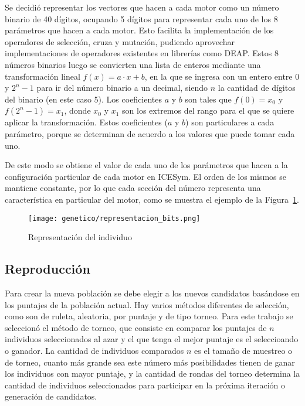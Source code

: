 Se decidió representar los vectores que hacen a cada motor como un número
binario de 40 dígitos, ocupando 5 dígitos para representar cada uno de los 8
parámetros que hacen a cada motor.
%
Esto facilita la implementación de los operadores de selección, cruza y
mutación, pudiendo aprovechar implementaciones de operadores existentes en
librerías como DEAP.
%
Estos 8 números binarios luego se convierten una lista de enteros mediante una
transformación lineal $f(x)=a\cdot x+b$, en la que se ingresa con un entero
entre 0 y $2^{n}-1$ para ir del número binario a un decimal, siendo $n$ la
cantidad de dígitos del binario (en este caso 5).
%
Los coeficientes $a$ y $b$ son tales que $f(0)=x_{0}$ y $f(2^{n}-1) = x_{1}$,
donde $x_{0}$ y $x_{1}$ son los extremos del rango para el que se quiere aplicar
la transformación.
%
Estos coeficientes ($a$ y $b$) son particulares a cada parámetro, porque se
determinan de acuerdo a los valores que puede tomar cada uno.

De este modo se obtiene el valor de cada uno de los parámetros que hacen a la
configuración particular de cada motor en ICESym.
%
El orden de los mismos se mantiene constante, por lo que cada sección del número
representa una característica en particular del motor, como se muestra el
ejemplo de la Figura~\ref{fig:pop_bit}.
%

\begin{figure}[ht]
  \centering
  \texttt{[image: genetico/representacion\_bits.png]}
  \caption{Representación del individuo}\label{fig:pop_bit}
\end{figure}


\subsection{Reproducción}

Para crear la nueva población se debe elegir a los nuevos candidatos basándose
en los puntajes de la población actual.
%
Hay varios métodos diferentes de selección, como son de ruleta, aleatoria, por
puntaje y de tipo torneo.
%
Para este trabajo se seleccionó el método de torneo, que consiste en comparar
los puntajes de $n$ individuos seleccionados al azar y el que tenga el mejor
puntaje es el seleccioando o ganador.
%
La cantidad de individuos comparados $n$ es el tamaño de muestreo o de torneo,
cuanto más grande sea este número más posibilidades tienen de ganar los
individuos con mayor puntaje, y la cantidad de rondas del torneo determina la
cantidad de individuos seleccionados para participar en la próxima iteración o
generación de candidatos.


